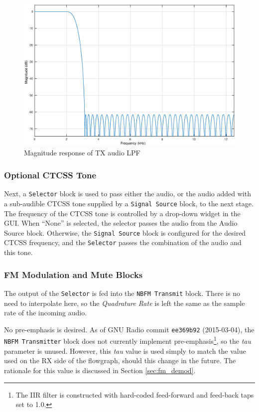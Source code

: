 \begin{figure}[h!]
  \centering
  \includegraphics[width=5in]{images/frs/filter/tx/audio-fir.eps}
  \caption{Magnitude response of TX audio LPF}
  \label{fig:filtresp_tx_audio}
\end{figure}

\subsubsection{Optional CTCSS Tone}

Next, a \texttt{Selector} block is used to pass either the audio, or the audio
added with a sub-audible \ac{CTCSS} tone supplied by a \texttt{Signal Source} block, to the
next stage. The frequency of the \ac{CTCSS} tone is controlled by a drop-down
widget in the GUI.  When ``None'' is selected, the selector passes the audio
from the Audio Source block.  Otherwise, the \texttt{Signal Source} block is
configured for the desired \ac{CTCSS} frequency, and the \texttt{Selector}
passes the combination of the audio and this tone.

\subsubsection{FM Modulation and Mute Blocks}

The output of the \texttt{Selector} is fed into the \texttt{NBFM Transmit} block.
There is no need to interpolate here, so the \textit{Quadrature Rate} is left
the same as the sample rate of the incoming audio.

No pre-emphasis is desired. As of GNU Radio commit \texttt{ee369b92}
(2015-03-04), the \texttt{NBFM Transmitter} block does not currently implement
pre-emphasis\footnote{The IIR filter is constructed with hard-coded
feed-forward and feed-back taps set to 1.0.}, so the \textit{tau} parameter
is unused.  However, this \textit{tau} value is used simply to match the value
used on the RX side of the flowgraph, should this change in the future. The
rationale for this value is discussed in Section \ref{sec:fm_demod}.

